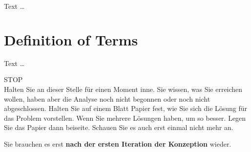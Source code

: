 \documentclass[11pt,a4paper,english]{scrreprt}
\newenvironment{comment}
  {\par\medskip
   \begingroup\color{olive}%
   }
 {\endgroup
  \medskip}
\begin{document}
Text \dots

\section{Definition of Terms}
Text \dots

\clearpage
\begin{comment}
\begin{center}
\huge
STOP\\
\normalsize
Halten Sie an dieser Stelle für einen Moment inne. Sie wissen, was Sie erreichen wollen, haben aber die Analyse noch nicht begonnen oder noch nicht abgeschlossen. Halten Sie auf einem Blatt Papier fest, wie Sie sich die Lösung für das Problem vorstellen. Wenn Sie mehrere Lösungen haben, um so besser. Legen Sie das Papier dann beiseite. Schauen Sie es auch erst einmal nicht mehr an.

Sie brauchen es erst \textbf{nach der ersten Iteration der Konzeption} wieder.
\end{center}
\end{comment}

\newpage
\end{document}
